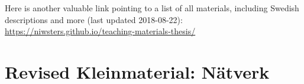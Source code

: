 \egroup
\vspace{-0.5cm}
Here is another valuable link pointing to a list of all materials, including Swedish descriptions and more  (last updated 2018-08-22):\\
\url{https://niwsters.github.io/teaching-materials-thesis/}


\newpage

\section{Revised Kleinmaterial: Nätverk}
\label{app:case1}


